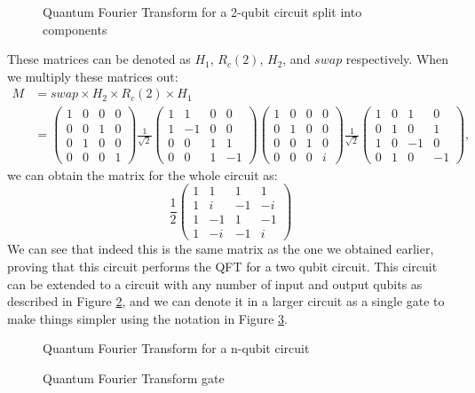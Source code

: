 \begin{figure}[!htb]
\centering
\resizebox{8cm}{!}{}
\caption{Quantum Fourier Transform for a 2-qubit circuit split into components}
\label{fig:qft2qubitsplit}
\end{figure}
These matrices can be denoted as $H_1$, $R_c(2)$, $H_2$, and $swap$ respectively. When we multiply these matrices out:
\begin{align*}
M &= swap \times H_2 \times R_c(2) \times H_1\\
&=
\begin{pmatrix}
1 & 0 & 0 & 0\\
0 & 0 & 1 & 0\\
0 & 1 & 0 & 0\\
0 & 0 & 0 & 1
\end{pmatrix} 
\frac{1}{\sqrt{2}}
\begin{pmatrix}
1 & 1 & 0 & 0\\
1 & -1 & 0 & 0\\
0 & 0 & 1 & 1\\
0 & 0 & 1 & -1
\end{pmatrix}
\begin{pmatrix}
1 & 0 & 0 & 0\\
0 & 1 & 0 & 0\\
0 & 0 & 1 & 0\\
0 & 0 & 0 & i
\end{pmatrix}
\frac{1}{\sqrt{2}}
\begin{pmatrix}
1 & 0 & 1 & 0\\
0 & 1 & 0 & 1\\
1 & 0 & -1 & 0\\
0 & 1 & 0 & -1
\end{pmatrix},
\end{align*}
we can obtain the matrix for the whole circuit as:
$$
\frac{1}{2}
\begin{pmatrix}
1 & 1 & 1 & 1\\
1 & i & -1 & -i\\
1 & -1 & 1 & - 1\\
1 & -i & -1 & i
\end{pmatrix}
$$
We can see that indeed this is the same matrix as the one we obtained earlier, proving that this circuit performs the QFT for a two qubit circuit.
This circuit can be extended to a circuit with any number of input and output qubits as described in Figure \ref{fig:QFTnQubit}, and we can denote it in a larger circuit as a single gate to make things simpler using the notation in Figure \ref{fig:QFTgate}.
\begin{figure}[!htb]
\centering
\resizebox{\linewidth}{!}{}
\caption{Quantum Fourier Transform for a n-qubit circuit}
\label{fig:QFTnQubit}
\end{figure}
\begin{figure}[!htb]
\centering
\resizebox{3cm}{!}{}
\caption{Quantum Fourier Transform gate}
\label{fig:QFTgate}
\end{figure}
